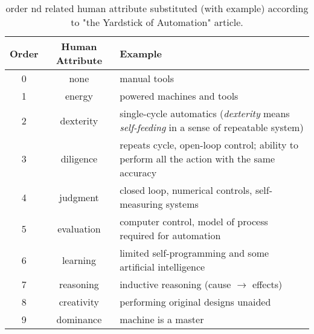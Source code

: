 	\begin{table}[bt]
		\centering
		\tabrule
		\caption{order nd related human attribute substituted (with example) according to "the Yardstick of Automation" article.} \label{tab:ind:amber}\vspace{2mm}
		\begin{tabular} { c c p{10cm} }
			Order & Human Attribute &  Example \\ \hline
			0 & none & manual tools \\
			1 & energy & powered machines and tools \\
			2 & dexterity & single-cycle automatics (\textit{dexterity} means \textit{self-feeding} in a sense of repeatable system) \\
			3 & diligence & repeats cycle, open-loop control; ability to perform all the action with the same accuracy \\
			4 & judgment & closed loop, numerical controls, self-measuring systems \\
			5 & evaluation & computer control, model of process required for automation \\
			6 & learning & limited self-programming and some artificial intelligence \\
			7 & reasoning & inductive reasoning (cause $\rightarrow$ effects) \\
			8 & creativity & performing original designs unaided \\
			9 & dominance & machine is a master
			
		\end{tabular}	
		
		\vspace{2mm}
		\tabrule
	\end{table}
	
